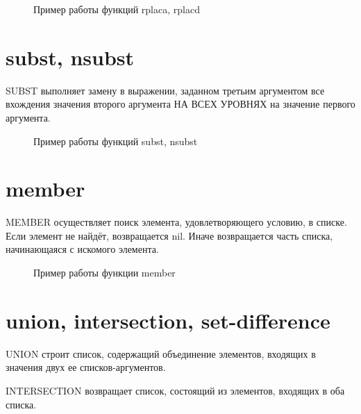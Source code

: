 \begin{figure}[H]
    \begin{listingbox}{}
        
    \end{listingbox}
    \caption{Пример работы функций rplaca, rplacd}
    \label{lst:rplaca-rplacd-example}
\end{figure}

\section{subst, nsubst}

SUBST выполняет замену в выражении, заданном третьим аргументом 
все вхождения значения второго аргумента НА ВСЕХ УРОВНЯХ на 
значение первого аргумента.

\begin{figure}[H]
    \begin{listingbox}{}
        
    \end{listingbox}
    \caption{Пример работы функций subst, nsubst}
    \label{lst:subst-nsubst-example}
\end{figure}

\section{member}

MEMBER осуществляет поиск элемента, удовлетворяющего условию, 
в списке. Если элемент не найдёт, возвращается nil. Иначе 
возвращается часть списка, начинающаяся с искомого элемента.

\begin{figure}[H]
    \begin{listingbox}{}
        
    \end{listingbox}
    \caption{Пример работы функции member}
    \label{lst:member-example}
\end{figure}

\section{union, intersection, set-difference}

UNION строит список, содержащий объединение элементов, входящих 
в значения двух ее списков-аргументов.

INTERSECTION возвращает список, состоящий из элементов, входящих 
в оба списка.

